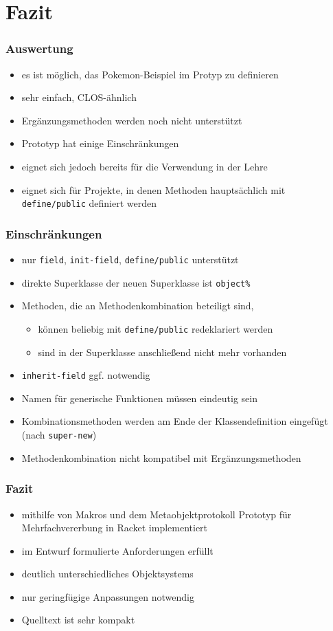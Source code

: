 \documentclass{beamer}
\begin{document}
\section{Fazit}
\frame{\tableofcontents[currentsection]}

\begin{frame}
\frametitle{Auswertung}
 \begin{itemize}
  \item es ist möglich, das Pokemon-Beispiel im Protyp zu definieren
  \item sehr einfach, CLOS-ähnlich
  \item Ergänzungsmethoden werden noch nicht unterstützt
  \item Prototyp hat einige Einschränkungen
  \item eignet sich jedoch bereits für die Verwendung in der Lehre
  \item eignet sich für Projekte, in denen Methoden hauptsächlich mit \texttt{define/public} definiert werden
 \end{itemize}
\end{frame}

\begin{frame}
 \frametitle{Einschränkungen}
 \begin{itemize}
  \item nur \texttt{field}, \texttt{init-field}, \texttt{define/public} unterstützt
  \item direkte Superklasse der neuen Superklasse ist \texttt{object\%}
  \item Methoden, die an Methodenkombination beteiligt sind, 
  \begin{itemize}
   \item können beliebig mit \texttt{define/public} redeklariert werden
   \item sind in der Superklasse anschließend nicht mehr vorhanden
  \end{itemize}
  \item \texttt{inherit-field} ggf. notwendig
  \item Namen für generische Funktionen müssen eindeutig sein
  \item Kombinationsmethoden werden am Ende der Klassendefinition eingefügt (nach \texttt{super-new})
  \item Methodenkombination nicht kompatibel mit Ergänzungsmethoden
  \end{itemize}
\end{frame}

\begin{frame}
 \frametitle{Fazit}
 \begin{itemize}
  \item mithilfe von Makros und dem Metaobjektprotokoll Prototyp für Mehrfachvererbung in Racket implementiert
  \item im Entwurf formulierte Anforderungen erfüllt
  \item deutlich unterschiedliches Objektsystems 
  \item nur geringfügige Anpassungen notwendig
  \item Quelltext ist sehr kompakt
   \end{itemize}
  \end{frame}
  
\end{document}
